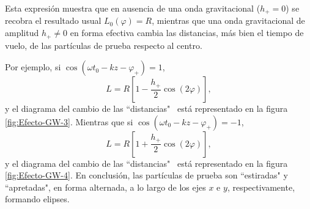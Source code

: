 \documentclass[letterpaper,11pt]{article}
\begin{document}
Esta expresión muestra que en ausencia de una onda gravitacional ($h_{+} = 0$) se recobra el resultado usual $L_0(\varphi) = R$, mientras que una onda gravitacional de amplitud $h_{+} \neq 0$ en forma efectiva cambia las distancias, más bien el tiempo de vuelo, de las partículas de prueba respecto al centro.

Por ejemplo, si $\cos(\omega t_0 - kz - \varphi_{+}) = 1$,
\begin{equation}
L = R \left[1 - \frac{h_{+}}{2} \cos(2\varphi) \right],
\end{equation} 
y el diagrama del cambio de las ``distancias" \ está representado en la figura \ref{fig:Efecto-GW-3}. Mientras que si $\cos(\omega t_0 - kz - \varphi_{+}) = -1$,
\begin{equation}
L = R \left[1 + \frac{h_{+}}{2} \cos(2\varphi) \right],
\end{equation} 
y el diagrama del cambio de las ``distancias" \ está representado en la figura \ref{fig:Efecto-GW-4}. En conclusión, las partículas de prueba son ``estiradas" y ``apretadas", en forma alternada, a lo largo de los ejes $x$ e $y$, respectivamente, formando elipses.
\end{document}
